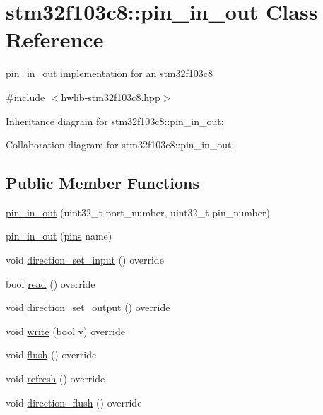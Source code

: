 \hypertarget{classstm32f103c8_1_1pin__in__out}{}\section{stm32f103c8\+:\+:pin\+\_\+in\+\_\+out Class Reference}
\label{classstm32f103c8_1_1pin__in__out}


\hyperlink{classstm32f103c8_1_1pin__in__out}{pin\+\_\+in\+\_\+out} implementation for an \hyperlink{namespacestm32f103c8}{stm32f103c8}  




{\ttfamily \#include $<$hwlib-\/stm32f103c8.\+hpp$>$}



Inheritance diagram for stm32f103c8\+:\+:pin\+\_\+in\+\_\+out\+:


Collaboration diagram for stm32f103c8\+:\+:pin\+\_\+in\+\_\+out\+:
\subsection*{Public Member Functions}
\begin{DoxyCompactItemize}
\item 
\hyperlink{classstm32f103c8_1_1pin__in__out_ae0be32694f4e9cdedf30d3e6b8514af9}{pin\+\_\+in\+\_\+out} (uint32\+\_\+t port\+\_\+number, uint32\+\_\+t pin\+\_\+number)
\item 
\hyperlink{classstm32f103c8_1_1pin__in__out_a61988e52e555670c6ee886cb25f1bd82}{pin\+\_\+in\+\_\+out} (\hyperlink{namespacestm32f103c8_a69d642506db309a7e64295d35ec21ff6}{pins} name)
\item 
void \hyperlink{classstm32f103c8_1_1pin__in__out_ac76dc0765d36d13b9d24f7939af1e39f}{direction\+\_\+set\+\_\+input} () override
\item 
bool \hyperlink{classstm32f103c8_1_1pin__in__out_a9ca1d7aba45a4f28c9a69114dd6caf5b}{read} () override
\item 
void \hyperlink{classstm32f103c8_1_1pin__in__out_ac5e1d7c630e1b25467c224110ed9de1c}{direction\+\_\+set\+\_\+output} () override
\item 
void \hyperlink{classstm32f103c8_1_1pin__in__out_ad8ae1c5cbeb418a79de579a3a2386310}{write} (bool v) override
\item 
void \hyperlink{classstm32f103c8_1_1pin__in__out_aae0b516a0f186e8f6be498af8b1ca238}{flush} () override
\item 
void \hyperlink{classstm32f103c8_1_1pin__in__out_a58499208b2e6049e7ae88862b029099f}{refresh} () override
\item 
void \hyperlink{classstm32f103c8_1_1pin__in__out_ab174d020536c2572ac5a0875ed8af10e}{direction\+\_\+flush} () override
\end{DoxyCompactItemize}


